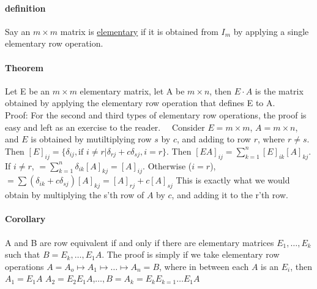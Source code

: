 \documentclass[10pt,letter]{article}
\begin{document}
\paragraph{definition}
Say an $m\times m$ matrix is \underline{elementary} if it is obtained from $I_m$ by applying a single elementary row operation. 

\paragraph{Theorem}
Let E be an $m\times m$ elementary matrix, let A be $m\times n$, then $E\cdot A$ is the matrix obtained by applying the elementary row operation that defines E to A. \\ 
Proof: For the second and third types of elementary row operations, the proof is easy and left as an exercise to the reader. \ \ 
Consider $E=m\times m$, $A=m\times n$, and $E$ is obtained by mutiltiplying row $s$ by $c$, and adding to row $r$, where $r\neq s$. Then $[E]_{ij}=\{\delta_{ij}, \text{if }i\neq r| \delta_{rj}+c\delta_{sj}, i=r\}$. Then $[EA]_{ij}=\sum_{k=1}^n[E]_{ik}[A]_{kj}$. If $i\neq r$, $=\sum_{k=1}^n\delta_{ik}[A]_{kj}=[A]_{ij}$. Otherwise ($i=r$), $=\sum(\delta_{ik}+c\delta_{sj})[A]_{kj}=[A]_{rj}+c[A]_{sj}$ This is exactly what we would obtain by multiplying the s'th row of $A$ by $c$, and adding it to the r'th row. 

\paragraph{Corollary} 
A and B are row equivalent if and only if there are elementary matrices $E_1,\ldots,E_k$ such that $B=E_k,\ldots,E_1A$. The proof is simply if we take elementary row operations $A=A_o\mapsto A_1\mapsto\ldots\mapsto A_n=B$, where in between each $A$ is an $E_i$, then $A_1=E_1A$ $A_2=E_2E_1A$,$\ldots, B=A_k=E_kE_{k=1}\ldots E_1A$
\end{document}
